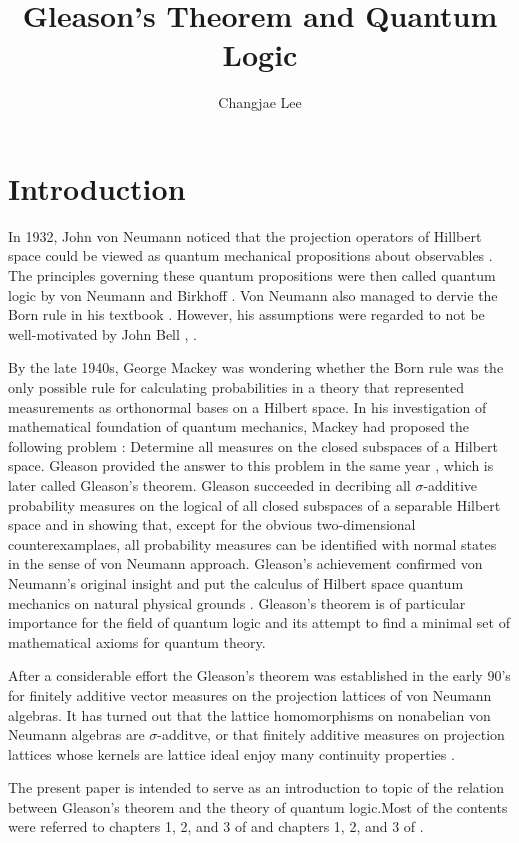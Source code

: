 \documentclass[a4paper,11pt]{report}
\title{Gleason's Theorem and Quantum Logic}
\author{Changjae Lee}
\theoremstyle{definition}
\theoremstyle{plain}
\theoremstyle{remark}
\begin{document}
\maketitle

\tableofcontents

\chapter*{Introduction}

In 1932, John von Neumann noticed that the projection operators of Hillbert space could be viewed as quantum mechanical propositions about observables \cite{Neumann2018}. The principles governing these quantum propositions were then called quantum logic by von Neumann and Birkhoff \cite{MR1503312}. Von Neumann also managed to dervie the Born rule in his textbook \cite{Neumann2018}. However, his assumptions were regarded to not be well-motivated by John Bell \cite{MR208927}, \cite{MR2726358}.

By the late 1940s, George Mackey was wondering whether the Born rule was the only possible rule for calculating probabilities in a theory that represented measurements as orthonormal bases on a Hilbert space. In his investigation of mathematical foundation of quantum mechanics, Mackey had proposed the following problem \cite[p.50-51]{MR96112}\cite[p.129]{MR1256736}: Determine all measures on the closed subspaces of a Hilbert space. Gleason provided the answer to this problem in the same year \cite{MR96113}, which is later called Gleason's theorem. Gleason succeeded in decribing all \(\sigma\)-additive probability measures on the logical of all closed subspaces of a separable Hilbert space and in showing that, except for the obvious two-dimensional counterexamplaes, all probability measures can be identified with normal states in the sense of von Neumann approach. Gleason's achievement confirmed von Neumann's original insight and put the calculus of Hilbert space quantum mechanics on natural physical grounds \cite[p.87-88]{MR2015280}. Gleason's theorem is of particular importance for the field of quantum logic and its attempt to find a minimal set of mathematical axioms for quantum theory.

After a considerable effort the Gleason's theorem was established in the early 90's for finitely additive vector measures on the projection lattices of von Neumann algebras. It has turned out that the lattice homomorphisms on nonabelian von Neumann algebras are \(\sigma\)-additve, or that finitely additive measures on projection lattices whose kernels are lattice ideal enjoy many continuity properties \cite[p.3-4]{MR2015280}.

The present paper is intended to serve as an introduction to topic of the relation between Gleason's theorem and the theory of quantum logic.Most of the contents were referred to chapters 1, 2, and 3 of \cite{MR1256736} and chapters 1, 2, and 3 of \cite{MR2015280}.








\end{document}
